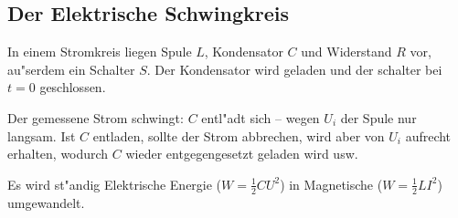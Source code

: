 \subsection{Der Elektrische Schwingkreis}
\label{kap_elektrische-schwingkreis}

In einem Stromkreis liegen Spule $L$, Kondensator $C$ und Widerstand
$R$ vor, au"serdem ein Schalter $S$. Der Kondensator wird geladen und
der schalter bei $t =0$ geschlossen.

Der gemessene Strom schwingt: $C$ entl"adt sich --  wegen $U_i$ der
Spule nur langsam. Ist $C$ entladen, sollte der Strom abbrechen, wird
aber von $U_i$ aufrecht erhalten, wodurch $C$ wieder entgegengesetzt
geladen wird usw.

\begin{Wichtig}
   Es wird st"andig Elektrische Energie ($W = \frac{1}{2}CU^2$) in
   Magnetische ($W = \frac{1}{2}LI^2$) umgewandelt.
\end{Wichtig}

